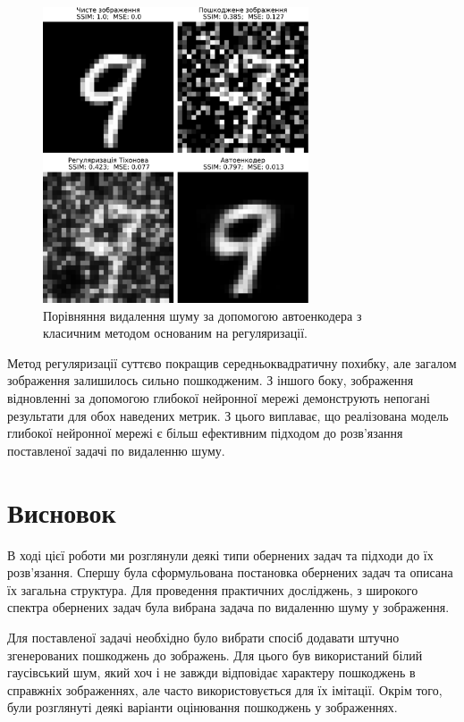 \documentclass[14pt,a4paper]{extarticle}
\newcounter{e}
\numberwithin{equation}{section}
\numberwithin{figure}{section}
\begin{document}
	\begin{figure}[H]
		\centering
		\includegraphics[width=0.7\textwidth]{../resources/denoising-methods-comparation.pdf}
		\caption{Порівняння видалення шуму за допомогою автоенкодера з класичним методом основаним на регуляризації.}
		\label{fig:denoising-methods-comparation}
	\end{figure}

	Метод регуляризації суттєво покращив середньоквадратичну похибку, але загалом зображення залишилось сильно пошкодженим. З іншого боку, зображення відновленні за допомогою глибокої нейронної мережі демонструють непогані результати для обох наведених метрик. З цього виплаває, що реалізована модель глибокої нейронної мережі є більш ефективним підходом до розв'язання поставленої задачі по видаленню шуму.

	\newpage
	\thispagestyle{empty}
	\section*{Висновок}
	\begin{center}\end{center}
	В ході цієї роботи ми розглянули деякі типи обернених задач та підходи до їх розв'язання. Спершу була сформульована постановка обернених задач та описана їх загальна структура. Для проведення практичних досліджень, з широкого спектра обернених задач була вибрана задача по видаленню шуму у зображення.
	
	Для поставленої задачі необхідно було вибрати спосіб додавати штучно згенерованих пошкоджень до зображень. Для цього був використаний білий гаусівський шум, який хоч і не завжди відповідає характеру пошкоджень в справжніх зображеннях, але часто використовується для їх імітації. Окрім того, були розглянуті деякі варіанти оцінювання пошкоджень у зображеннях.
	
\end{document}
